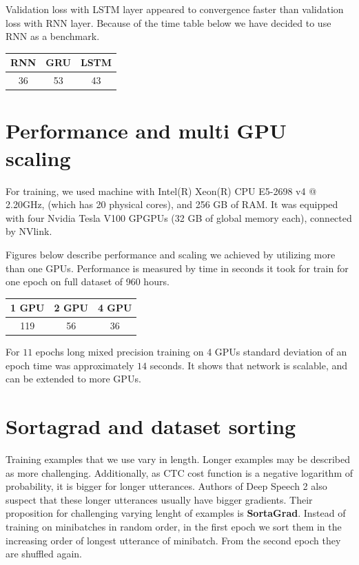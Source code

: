 \documentclass[licencjacka,en]{pracamgr}
\begin{document}
Validation loss with LSTM layer appeared to convergence faster than validation loss with RNN layer. Because of the time table below we have decided to use RNN as a benchmark.

{
\centering
\begin{tabular}{|c|c|c|}
        \hline
        RNN & GRU & LSTM \\
        \hline
        \hline
        36 & 53 & 43 \\
        \hline
    \end{tabular}
}


\section{Performance and multi GPU scaling}
For training, we used machine with Intel(R) Xeon(R) CPU E5-2698 v4 @ 2.20GHz, (which has 20 physical cores), and 256 GB of RAM. It was equipped with four Nvidia Tesla V100 GPGPUs (32 GB of global memory each), connected by NVlink.

Figures below describe performance and scaling we achieved by utilizing more than one GPUs. Performance is measured by time in seconds it took for train for one epoch on full dataset of 960 hours.

{
\centering
\begin{tabular}{|c|c|c|}
        \hline
        1 GPU & 2 GPU & 4 GPU \\
        \hline
        \hline
        119 & 56 & 36 \\
        \hline
    \end{tabular}
}

For $11$ epochs long mixed precision training on 4 GPUs standard deviation of an epoch time was approximately $14$ seconds. It shows that network is scalable, and can be extended to more GPUs.


\section{Sortagrad and dataset sorting}
Training examples that we use vary in length. Longer examples may be described as more challenging. Additionally, as CTC cost function is a negative logarithm of probability, it is bigger for longer utterances. Authors of Deep Speech 2 also suspect that these longer utterances usually have bigger gradients. Their proposition for challenging varying lenght of examples is \textbf{SortaGrad}. Instead of training on minibatches in random order, in the first epoch we sort them in the increasing order of longest utterance of minibatch. From the second epoch they are shuffled again.
\end{document}
